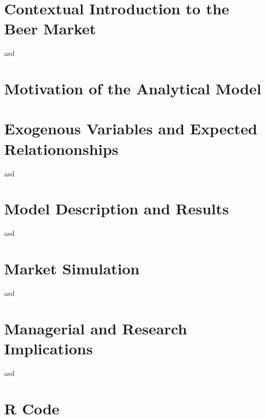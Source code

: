 \documentclass[12pt,a4paper]{article}
\begin{document}
\section{Contextual Introduction to the Beer Market}
asd
\section{Motivation of the Analytical Model}

\section{Exogenous Variables and Expected Relationonships}
asd
\section{Model Description and Results}
asd
\section{Market Simulation}
asd
\section{Managerial and Research Implications}
asd
\clearpage
\appendix
\section{R Code}
\end{document}
